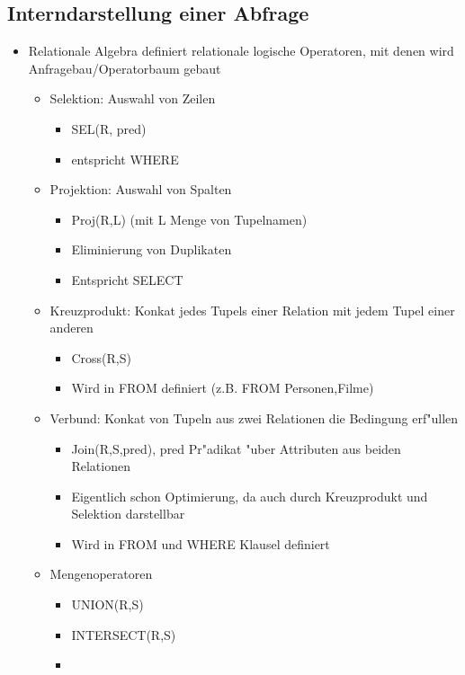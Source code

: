 \documentclass[a4paper, 12pt]{scrartcl}
\begin{document}
\subsection{Interndarstellung einer Abfrage}
\begin{itemize}
	\item
		Relationale Algebra definiert relationale logische Operatoren, mit denen wird Anfragebau/Operatorbaum gebaut
		\begin{itemize}
			\item
				Selektion: Auswahl von Zeilen
				\begin{itemize}
					\item
						SEL(R, pred)
					\item
						entspricht WHERE
				\end{itemize}
			\item
				Projektion: Auswahl von Spalten
				\begin{itemize}
					\item
						Proj(R,L) (mit L Menge von Tupelnamen)
					\item
						Eliminierung von Duplikaten
					\item
						Entspricht SELECT
				\end{itemize}
			\item
				Kreuzprodukt: Konkat jedes Tupels einer Relation mit jedem Tupel einer anderen
				\begin{itemize}
					\item
						Cross(R,S)
					\item
						Wird in FROM definiert (z.B. FROM Personen,Filme)
				\end{itemize}
			\item
				Verbund: Konkat von Tupeln aus zwei Relationen die Bedingung erf"ullen
				\begin{itemize}
					\item
						Join(R,S,pred), pred Pr"adikat "uber Attributen aus beiden Relationen
					\item
						Eigentlich schon Optimierung, da auch durch Kreuzprodukt und Selektion darstellbar
					\item
						Wird in FROM und WHERE Klausel definiert
				\end{itemize}
			\item
				Mengenoperatoren
				\begin{itemize}
					\item
						UNION(R,S)
					\item
						INTERSECT(R,S)
					\item

\end{itemize}
\end{itemize}
\end{itemize}
\end{document}
